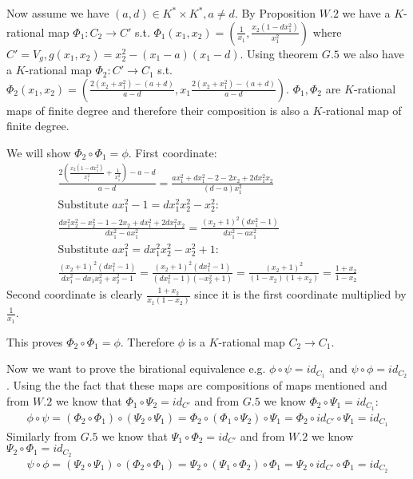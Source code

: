 \documentclass[12pt, a4paper]{article}
\begin{document}
Now assume we have $(a,d) \in K^* \times K^*, a\neq d$. By Proposition $W.2$ we have a $K$-rational map $\Phi_1: C_2 \rightarrow C'$ s.t. $\Phi_1(x_1,x_2) = \left(\frac{1}{x_1}, \frac{x_2(1-dx_1^2)}{x_1^2} \right)$ where $C' = V_g, g(x_1,x_2) = x_2^2-(x_1-a)(x_1-d)$. Using theorem $G.5$ we also have a $K$-rational map $\Phi_2: C' \rightarrow C_1$ s.t. $\Phi_2(x_1,x_2) = \left( \frac{2(x_2+x_1^2)-(a+d)}{a-d}, x_1\frac{2(x_2+x_1^2)-(a+d)}{a-d}\right)$. $\Phi_1, \Phi_2$ are $K$-rational maps of finite degree and therefore their composition is also a $K$-rational map of finite degree.

We will show $\Phi_2 \circ \Phi_1 = \phi$. First coordinate:
\begin{gather*}
\frac{2\left(\frac{x_2(1-dx_1^2)}{x_1^2}+\frac{1}{x_1^2}\right)-a-d}{a-d} = \frac{ax_1^2+dx_1^2-2-2x_2+2dx_1^2x_2}{(d-a)x_1^2}\\
\text{Substitute $ax_1^2-1 = dx_1^2x_2^2-x_2^2$:}\\
\frac{dx_1^2x_2^2-x_2^2-1-2x_2+dx_1^2+2dx_1^2x_2}{dx_1^2-ax_1^2} = \frac{(x_2+1)^2(dx_1^2-1)}{dx_1^2-ax_1^2}\\
\text{Substitute $ax_1^2 = dx_1^2x_2^2-x_2^2+1$:}\\
\frac{(x_2+1)^2(dx_1^2-1)}{dx_1^2-dx_1x_2^2+x_2^2-1} = \frac{(x_2+1)^2(dx_1^2-1)}{(dx_1^2-1)(-x_2^2+1)} = \frac{(x_2+1)^2}{(1-x_2)(1+x_2)} = \frac{1+x_2}{1-x_2}
\end{gather*}
Second coordinate is clearly $\frac{1+x_2}{x_1(1-x_2)}$ since it is the first coordinate multiplied by $\frac{1}{x_1}$.

This proves $\Phi_2 \circ \Phi_1 = \phi$. Therefore $\phi$ is a $K$-rational map $C_2 \rightarrow C_1$.

Now we want to prove the birational equivalence e.g. $\phi \circ \psi = id_{C_1}$ and $\psi \circ \phi = id_{C_2}$. Using the the fact that these maps are compositions of maps mentioned and from $W.2$ we know that $\Phi_1 \circ \Psi_2 = id_{C'}$ and from $G.5$ we know $\Phi_2 \circ \Psi_1 = id_{C_1}$:
\begin{gather*}
\phi \circ \psi = (\Phi_2 \circ \Phi_1) \circ (\Psi_2 \circ \Psi_1) = \Phi_2 \circ (\Phi_1 \circ \Psi_2) \circ \Psi_1 = \Phi_2 \circ id_{C'} \circ \Psi_1 = id_{C_1}
\end{gather*}
Similarly from $G.5$ we know that $\Psi_1 \circ \Phi_2 = id_{C'}$ and from $W.2$ we know $\Psi_2 \circ \Phi_1 = id_{C_2}$
\begin{gather*}
\psi \circ \phi =  (\Psi_2 \circ \Psi_1) \circ (\Phi_2 \circ \Phi_1) = \Psi_2 \circ (\Psi_1 \circ \Phi_2) \circ \Phi_1 = \Psi_2 \circ id_{C'} \circ \Phi_1 = id_{C_2}
\end{gather*}
\end{document}
